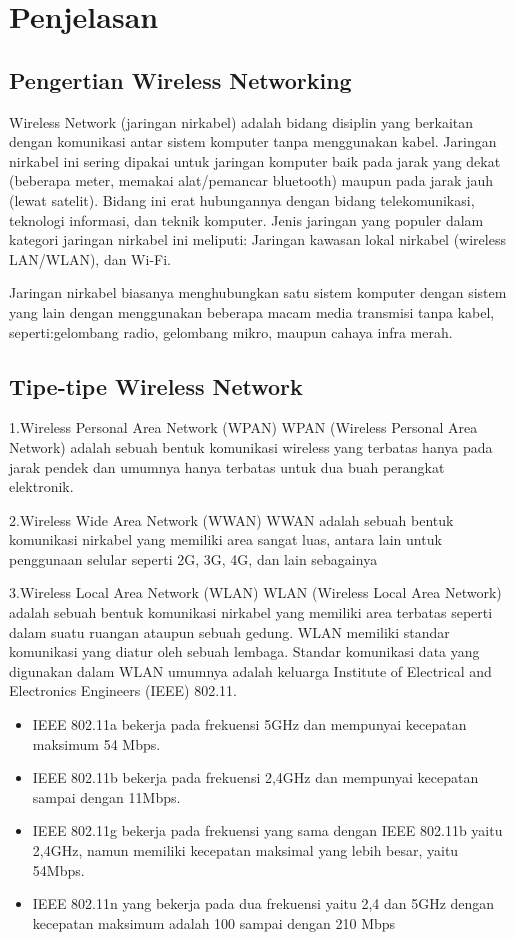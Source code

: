 \documentclass[conference]{IEEEtran}
\begin{document}
\section{Penjelasan}

\subsection{Pengertian Wireless Networking}
Wireless Network (jaringan nirkabel) adalah bidang disiplin yang berkaitan dengan komunikasi antar sistem komputer tanpa menggunakan kabel. Jaringan nirkabel ini sering dipakai untuk jaringan komputer baik pada jarak yang dekat (beberapa meter, memakai alat/pemancar bluetooth) maupun pada jarak jauh (lewat satelit). Bidang ini erat hubungannya dengan bidang telekomunikasi, teknologi informasi, dan teknik komputer. Jenis jaringan yang populer dalam kategori jaringan nirkabel ini meliputi: Jaringan kawasan lokal nirkabel (wireless LAN/WLAN), dan Wi-Fi.

Jaringan nirkabel biasanya menghubungkan satu sistem komputer dengan sistem yang lain dengan menggunakan beberapa macam media transmisi tanpa kabel, seperti:gelombang radio, gelombang mikro, maupun cahaya infra merah.



\subsection{Tipe-tipe Wireless Network}
1.Wireless Personal Area Network (WPAN)
WPAN (Wireless Personal Area Network) adalah sebuah bentuk komunikasi wireless yang terbatas hanya pada jarak pendek dan umumnya hanya terbatas untuk dua buah perangkat elektronik.
\vspace{5pt}

2.Wireless Wide Area Network (WWAN)
WWAN adalah sebuah bentuk komunikasi nirkabel yang memiliki area sangat luas, antara lain untuk penggunaan selular seperti 2G, 3G, 4G, dan lain sebagainya
\vspace{5pt}

3.Wireless Local Area Network (WLAN)
WLAN (Wireless Local Area Network) adalah sebuah bentuk komunikasi nirkabel yang memiliki area terbatas seperti dalam suatu ruangan ataupun sebuah gedung. WLAN memiliki standar komunikasi yang diatur oleh sebuah lembaga. Standar komunikasi data yang digunakan dalam WLAN umumnya adalah keluarga Institute of Electrical and Electronics Engineers (IEEE) 802.11.
\begin{itemize}
    \item  IEEE 802.11a bekerja pada frekuensi 5GHz dan mempunyai kecepatan maksimum 54 Mbps.
    \item IEEE 802.11b bekerja pada frekuensi 2,4GHz dan mempunyai kecepatan sampai dengan 11Mbps.
    \item IEEE 802.11g bekerja pada frekuensi yang sama dengan IEEE 802.11b yaitu 2,4GHz, namun memiliki kecepatan maksimal yang lebih besar, yaitu 54Mbps.
    \item   IEEE 802.11n yang bekerja pada dua frekuensi yaitu 2,4 dan 5GHz dengan kecepatan maksimum adalah 100 sampai dengan 210 Mbps
\end{itemize}
\vspace{5pt}
\end{document}
